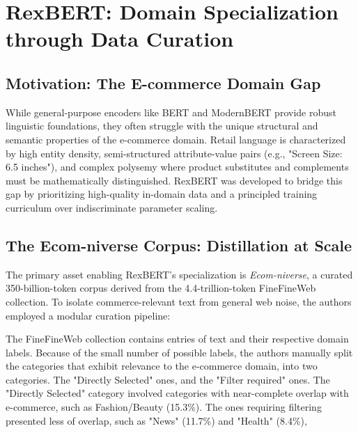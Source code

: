 \documentclass[a4paper,12pt]{article}
\begin{document}
\clearpage
\section{RexBERT: Domain Specialization through Data Curation}
\label{sec:rexbert}

\subsection{Motivation: The E-commerce Domain Gap}
While general-purpose encoders like BERT and ModernBERT \citep{warner2025smarter} provide robust linguistic foundations, they often struggle with the unique structural and semantic properties of the e-commerce domain. Retail language is characterized by high entity density, semi-structured attribute-value pairs (e.g., "Screen Size: 6.5 inches"), and complex polysemy where product substitutes and complements must be mathematically distinguished. RexBERT was developed to bridge this gap by prioritizing high-quality in-domain data and a principled training curriculum over indiscriminate parameter scaling.

\subsection{The Ecom-niverse Corpus: Distillation at Scale}
The primary asset enabling RexBERT's specialization is \textit{Ecom-niverse}, a curated 350-billion-token corpus derived from the 4.4-trillion-token FineFineWeb collection. To isolate commerce-relevant text from general web noise, the authors employed a modular curation pipeline:

The FineFineWeb collection contains entries of text and their respective domain labels. Because of the small number of possible labels, the authors manually split the categories that exhibit relevance to the e-commerce domain, into two categories. The "Directly Selected" ones, and the "Filter required" ones. The "Directly Selected" category involved categories with near-complete overlap with e-commerce, such as Fashion/Beauty (15.3\%). The ones requiring filtering presented less of overlap, such as "News" (11.7\%) and "Health" (8.4\%),
\end{document}

